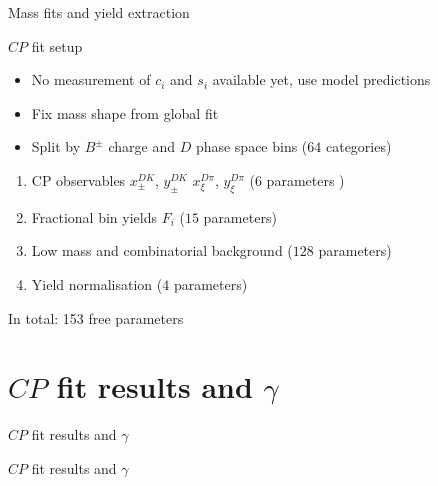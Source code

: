 \documentclass{beamer}
\begin{document}
\begin{frame}{Mass fits and yield extraction}
  \begin{center}
    \Large $C\!P$ fit setup
  \end{center}
  \begin{itemize}
    \setlength\itemsep{0.5em}
    \item{No measurement of $c_i$ and $s_i$ available yet, use model predictions}
    \item{Fix mass shape from global fit}
    \item{Split by $B^\pm$ charge and $D$ phase space bins ($64$ categories)}
  \end{itemize}
  \vspace{0.3cm}
  \begin{enumerate}
    \setlength\itemsep{0.5em}
    \item{CP observables $x_\pm^{DK}$, $y_\pm^{DK}$ $x_\xi^{D\pi}$, $y_\xi^{D\pi}$ ($6$ parameters
)}
    \item{Fractional bin yields $F_i$ ($15$ parameters)}
    \item{Low mass and combinatorial background ($128$ parameters)}
    \item{Yield normalisation ($4$ parameters)}
  \end{enumerate}
  In total: 153 free parameters
\end{frame}

\section{\texorpdfstring{$C\!P$}{CP} fit results and \texorpdfstring{$\gamma$}{gamma}}
\begin{frame}{$C\!P$ fit results and $\gamma$}
  \begin{center}
    {\huge $C\!P$ fit results and $\gamma$}
  \end{center}
\end{frame}
\end{document}
